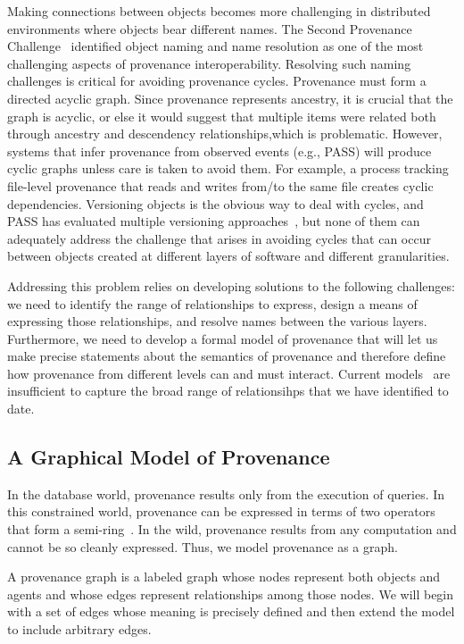 \documentclass[10pt]{article}
\begin{document}
Making connections between objects becomes more challenging in distributed
environments where objects bear different names.
The Second Provenance Challenge~\cite{challenge2} identified object
naming and name resolution as one of the most challenging aspects of
provenance interoperability.
Resolving such naming challenges is critical for avoiding provenance cycles.
Provenance must form a directed acyclic graph.
Since provenance represents ancestry, it is crucial that the graph is
acyclic, or else it would suggest that multiple items were related both
through ancestry and descendency relationships,which is problematic.
However, systems that infer provenance from observed events (e.g., PASS)
will produce cyclic graphs unless care is taken to avoid them.
For example, a process tracking file-level provenance that reads and writes
from/to the same file creates cyclic dependencies.
Versioning objects is the obvious way to deal with cycles, and PASS has
evaluated multiple versioning approaches~\cite{causalversioning-fast09},
but none of them can adequately address the challenge that arises in
avoiding cycles that can occur between objects created at different
layers of software and different granularities.

Addressing this problem relies on developing solutions to the following
challenges:
we need to identify the range of relationships to express,
design a means of expressing those relationships, and
resolve names between the various layers.
Furthermore, we need to develop a formal model of provenance that will
let us make precise statements about the semantics of provenance and
therefore define how provenance from different levels can and must interact.
Current models~\cite{opm,semirings,buneman-ww,cheney-wwh} are
insufficient to capture the broad range
of relationsihps that we have identified to date.

\subsection{A Graphical Model of Provenance}
\label{sec:graph}

In the database world, provenance results only from the execution of
queries.  In this constrained world, provenance can be expressed in
terms of two operators that form a semi-ring~\cite{semirings}.
In the wild, provenance results from any computation and cannot
be so cleanly expressed.
Thus, we model provenance as a graph.

A provenance graph is a labeled graph whose nodes represent both
objects and agents and whose edges represent relationships among
those nodes.
We will begin with a set of edges whose meaning is precisely defined
and then extend the model to include arbitrary edges.
\end{document}
